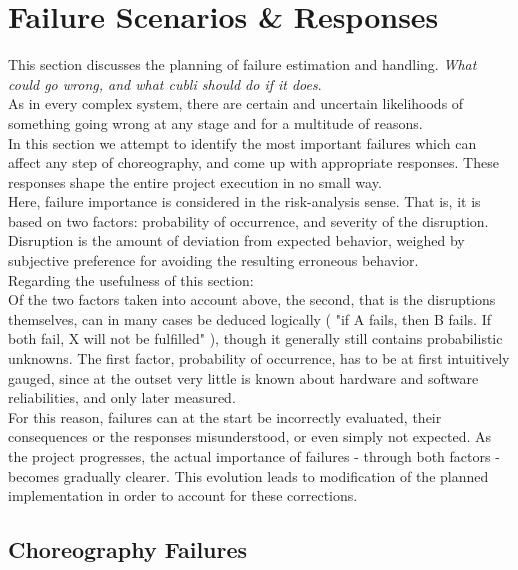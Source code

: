 \section{Failure Scenarios \& Responses}
This section discusses the planning of failure estimation and handling.
\textit{What could go wrong, and what cubli should do if it does}.\\

As in every complex system, there are certain and uncertain likelihoods of something going wrong at any stage and for a multitude of reasons.\\

In this section we attempt to identify the most important failures which can affect any step of choreography, and come up with appropriate responses. These responses shape the entire project execution in no small way.\\

Here, failure importance is considered in the risk-analysis sense. That is, it is based on two factors: probability of occurrence, and severity of the disruption. Disruption is the amount of deviation from expected behavior, weighed by subjective preference for avoiding the resulting erroneous behavior. \\

Regarding the usefulness of this section:\\

Of the two factors taken into account above, the second, that is the disruptions themselves, can in many cases be deduced logically ( "if A fails, then B fails. If both fail, X will not be fulfilled" ), though it generally still contains probabilistic unknowns. The first factor, probability of occurrence, has to be at first intuitively gauged, since at the outset very little is known about hardware and software reliabilities, and only later measured.\\

For this reason, failures can at the start be incorrectly evaluated, their consequences or the responses misunderstood, or even simply not expected. As the project progresses, the actual importance of failures - through both factors - becomes gradually clearer.  This evolution leads to modification of the planned implementation in order to account for these corrections.

\subsection{Choreography Failures}


